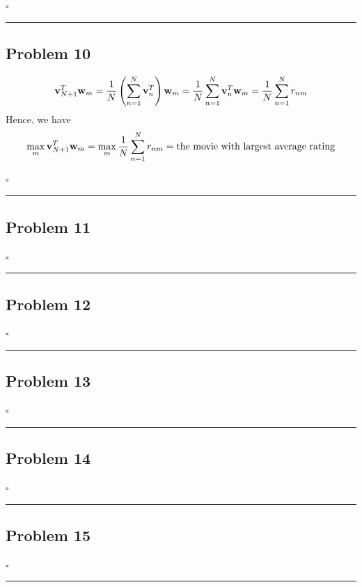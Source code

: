 \documentclass[12pt]{article}
\newcommand*{\QEDB}{\hfill\ensuremath{\square}}
\newcommand{\ParTh}[1]{\left(#1\right)}
\newcommand{\BF}[1]{{\bf#1}}
\newcommand{\horrule}[1]{\rule{\linewidth}{#1}}
\begin{document}
\QEDB

\horrule{0.5pt}

\subsection*{Problem 10}

\begin{align}
\BF{v}^T_{N+1}\BF{w}_m=\dfrac{1}{N}\ParTh{\sum_{n=1}^{N}\BF{v}^T_n}\BF{w}_m=\dfrac{1}{N}\sum_{n=1}^{N}\BF{v}^T_n\BF{w}_m=\dfrac{1}{N}\sum_{n=1}^{N}r_{nm}
\end{align}
Hence, we have
\begin{align}
\max_{m}\BF{v}^T_{N+1}\BF{w}_m=\max_{m}\dfrac{1}{N}\sum_{n=1}^{N}r_{nm}=\text{the movie with largest average rating}
\end{align}

\QEDB

\horrule{0.5pt}

\subsection*{Problem 11}

\QEDB

\horrule{0.5pt}

\subsection*{Problem 12}

\QEDB

\horrule{0.5pt}

\subsection*{Problem 13}

\QEDB

\horrule{0.5pt}

\subsection*{Problem 14}

\QEDB

\horrule{0.5pt}

\subsection*{Problem 15}

\QEDB

\horrule{0.5pt}
\end{document}
